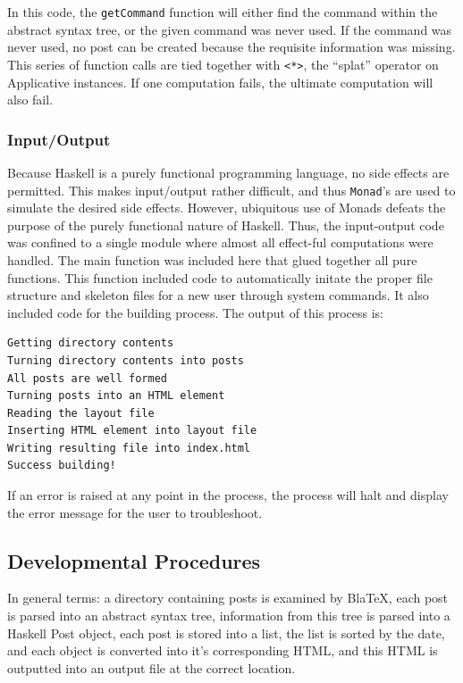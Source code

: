 \documentclass[doc,apacite,12pt]{apa6}
\begin{document}
    In this code, the \texttt{getCommand} function will either find the command within the abstract syntax tree, or the given command was never used. If the command was never used, no post can be created because the requisite information was missing. This series of function calls are tied together with \texttt{<*>}, the ``splat'' operator on Applicative instances. If one computation fails, the ultimate computation will also fail.  

  \subsubsection{Input/Output}
    Because Haskell is a purely functional programming language, no side effects are permitted. This makes input/output rather difficult, and thus \texttt{Monad}'s are used to simulate the desired side effects. However, ubiquitous use of Monads defeats the purpose of the purely functional nature of Haskell. Thus, the input-output code was confined to a single module where almost all effect-ful computations were handled. The main function was included here that glued together all pure functions. This function included code to automatically initate the proper file structure and skeleton files for a new user through system commands. It also included code for the building process. The output of this process is:

    \begin{verbatim}
Getting directory contents
Turning directory contents into posts
All posts are well formed
Turning posts into an HTML element
Reading the layout file
Inserting HTML element into layout file
Writing resulting file into index.html
Success building!
    \end{verbatim} 

    If an error is raised at any point in the process, the process will halt and display the error message for the user to troubleshoot. 

\subsection{Developmental Procedures}

  In general terms: a directory containing posts is examined by BlaTeX, each post is parsed into an abstract syntax tree, information from this tree is parsed into a Haskell Post object, each post is stored into a list, the list is sorted by the date, and each object is converted into it's corresponding HTML, and this HTML is outputted into an output file at the correct location. 
\end{document}
